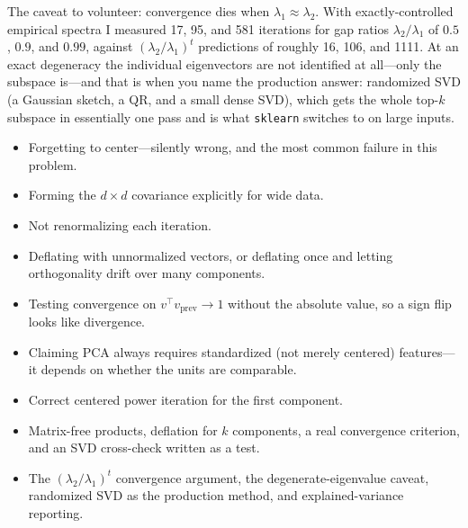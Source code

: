 \begin{interviewq}
The caveat to volunteer: convergence dies when $\lambda_1 \approx \lambda_2$. With exactly-controlled empirical spectra I measured 17, 95, and 581 iterations for gap ratios $\lambda_2/\lambda_1$ of $0.5$, $0.9$, and $0.99$, against $(\lambda_2/\lambda_1)^t$ predictions of roughly 16, 106, and 1111. At an exact degeneracy the individual eigenvectors are not identified at all---only the subspace is---and that is when you name the production answer: randomized SVD (a Gaussian sketch, a QR, and a small dense SVD), which gets the whole top-$k$ subspace in essentially one pass and is what \texttt{sklearn} switches to on large inputs.

\redflags
\begin{itemize}
    \item Forgetting to center---silently wrong, and the most common failure in this problem.
    \item Forming the $d \times d$ covariance explicitly for wide data.
    \item Not renormalizing each iteration.
    \item Deflating with unnormalized vectors, or deflating once and letting orthogonality drift over many components.
    \item Testing convergence on $v^\top v_{\text{prev}} \to 1$ without the absolute value, so a sign flip looks like divergence.
    \item Claiming PCA always requires standardized (not merely centered) features---it depends on whether the units are comparable.
\end{itemize}


\goodgreat
\begin{itemize}
    \item {} Correct centered power iteration for the first component.
    \item {} Matrix-free products, deflation for $k$ components, a real convergence criterion, and an SVD cross-check written as a test.
    \item {} The $(\lambda_2/\lambda_1)^t$ convergence argument, the degenerate-eigenvalue caveat, randomized SVD as the production method, and explained-variance reporting.
\end{itemize}

\end{interviewq}

